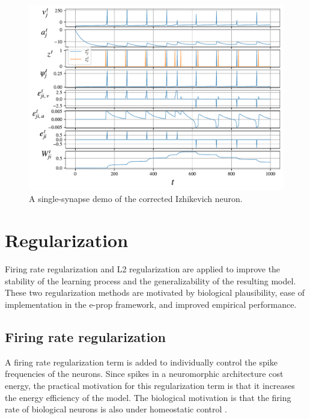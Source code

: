         \begin{figure}[ht]
            \centering
            \includegraphics[width=\linewidth]{gfx/demo_izh_corrected}
            \caption{A single-synapse demo of the corrected Izhikevich neuron.}
            \label{fig:demo_izh_corrected}
        \end{figure}


\section{Regularization}

	Firing rate regularization and L2 regularization are applied to improve the stability of the learning process and the generalizability of the resulting model.
	These two regularization methods are motivated by biological plausibility, ease of implementation in the e-prop framework, and improved empirical performance.

	\subsection{Firing rate regularization}
		A firing rate regularization term is added to individually control the spike frequencies of the neurons.
		Since spikes in a neuromorphic architecture cost energy, the practical motivation for this regularization term is that it increases the energy efficiency of the model.
		The biological motivation is that the firing rate of biological neurons is also under homeostatic control \citep{erickson2006activity}.

